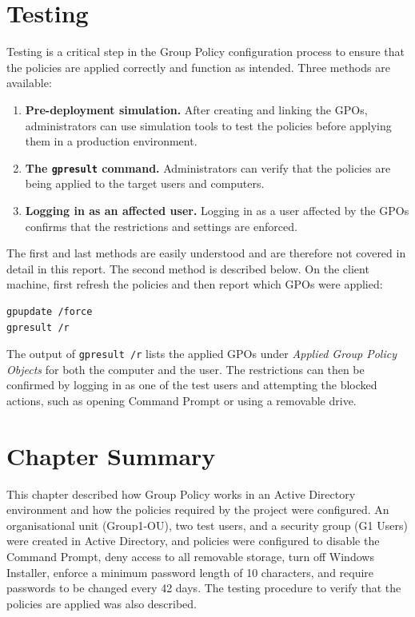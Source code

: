 
\section{Testing}
\label{sec:gpo-testing}
Testing is a critical step in the Group Policy configuration process to ensure that the policies are applied correctly and function as intended. Three methods are available:
\begin{enumerate}
  \item \textbf{Pre-deployment simulation.} After creating and linking the GPOs, administrators can use simulation tools to test the policies before applying them in a production environment.
  \item \textbf{The \texttt{gpresult} command.} Administrators can verify that the policies are being applied to the target users and computers.
  \item \textbf{Logging in as an affected user.} Logging in as a user affected by the GPOs confirms that the restrictions and settings are enforced.
\end{enumerate}

The first and last methods are easily understood and are therefore not covered in detail in this report. The second method is described below. On the client machine, first refresh the policies and then report which GPOs were applied:

\begin{lstlisting}
gpupdate /force
gpresult /r
\end{lstlisting}

The output of \texttt{gpresult /r} lists the applied GPOs under \emph{Applied Group Policy Objects} for both the computer and the user. The restrictions can then be confirmed by logging in as one of the test users and attempting the blocked actions, such as opening Command Prompt or using a removable drive.

\section{Chapter Summary}
\label{sec:gpo-summary}
This chapter described how Group Policy works in an Active Directory environment and how the policies required by the project were configured. An organisational unit (Group1-OU), two test users, and a security group (G1 Users) were created in Active Directory, and policies were configured to disable the Command Prompt, deny access to all removable storage, turn off Windows Installer, enforce a minimum password length of 10 characters, and require passwords to be changed every 42 days. The testing procedure to verify that the policies are applied was also described.
